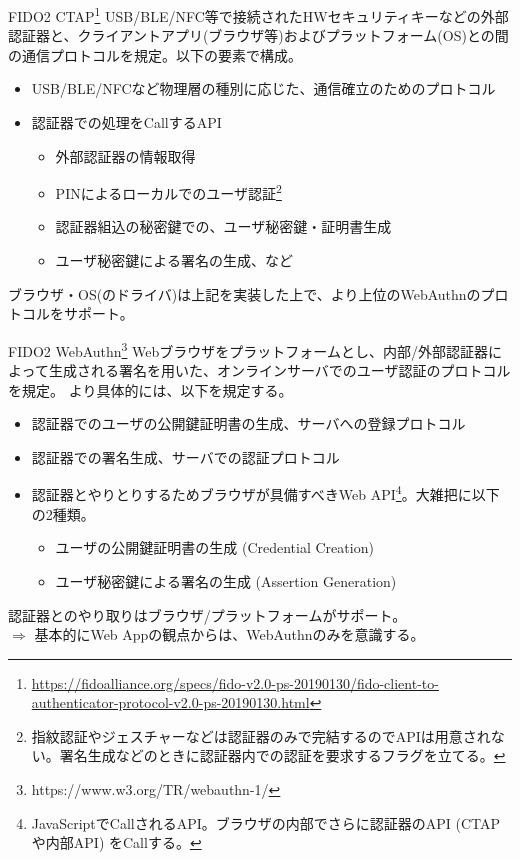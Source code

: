 \documentclass[12pt,dvipdfmx,uplatex]{beamer}
\begin{document}
\begin{frame}
\begin{block}{\small FIDO2 CTAP\footnote[frame]{\tiny \url{https://fidoalliance.org/specs/fido-v2.0-ps-20190130/fido-client-to-authenticator-protocol-v2.0-ps-20190130.html}}}
USB/BLE/NFC等で接続されたHWセキュリティキーなどの\alert{外部認証器と、クライアントアプリ(ブラウザ等)およびプラットフォーム(OS)との間の通信プロトコル}を規定。以下の要素で構成。
\begin{itemize}
\item USB/BLE/NFCなど物理層の種別に応じた、通信確立のためのプロトコル
\item 認証器での処理をCallするAPI
\begin{itemize}
\item 外部認証器の情報取得
\item PINによるローカルでのユーザ認証\footnote[frame]{\tiny 指紋認証やジェスチャーなどは認証器のみで完結するのでAPIは用意されない。署名生成などのときに認証器内での認証を要求するフラグを立てる。}
\item 認証器組込の秘密鍵での、ユーザ秘密鍵・証明書生成
\item ユーザ秘密鍵による署名の生成、など
\end{itemize}
\end{itemize}
\end{block}
ブラウザ・OS(のドライバ)は上記を実装した上で、より上位のWebAuthnのプロトコルをサポート。
\end{frame}


\begin{frame}
\begin{block}{\small FIDO2 WebAuthn\footnote[frame]{\tiny https://www.w3.org/TR/webauthn-1/}}
\alert{Webブラウザをプラットフォームとし、内部/外部認証器によって生成される署名を用いた、オンラインサーバでのユーザ認証のプロトコル}を規定。
より具体的には、以下を規定する。
\begin{itemize}
 \item 認証器でのユーザの公開鍵証明書の生成、サーバへの登録プロトコル
 \item 認証器での署名生成、サーバでの認証プロトコル
 \item 認証器とやりとりするためブラウザが具備すべきWeb API\footnote[frame]{\tiny JavaScriptでCallされるAPI。ブラウザの内部でさらに認証器のAPI (CTAPや内部API) をCallする。}。大雑把に以下の2種類。
\begin{itemize}
 \item ユーザの公開鍵証明書の生成 (Credential Creation)
 \item ユーザ秘密鍵による署名の生成 (Assertion Generation)
\end{itemize}
\end{itemize}
\end{block}
認証器とのやり取りはブラウザ/プラットフォームがサポート。\\
$\Rightarrow$ 基本的にWeb Appの観点からは、WebAuthnのみを意識する。
\end{frame}
\end{document}
